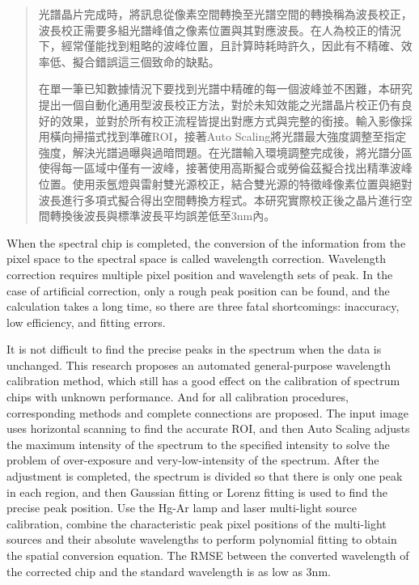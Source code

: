 
\begin{abstract}
	\vspace{-1.1cm}
光譜晶片完成時，將訊息從像素空間轉換至光譜空間的轉換稱為波長校正，波長校正需要多組光譜峰值之像素位置與其對應波長。在人為校正的情況下，經常僅能找到粗略的波峰位置，且計算時耗時許久，因此有不精確、效率低、擬合錯誤這三個致命的缺點。\par
在單一筆已知數據情況下要找到光譜中精確的每一個波峰並不困難，本研究提出一個自動化通用型波長校正方法，對於未知效能之光譜晶片校正仍有良好的效果，並對於所有校正流程皆提出對應方式與完整的銜接。輸入影像採用橫向掃描式找到準確ROI，接著Auto Scaling將光譜最大強度調整至指定強度，解決光譜過曝與過暗問題。在光譜輸入環境調整完成後，將光譜分區使得每一區域中僅有一波峰，接著使用高斯擬合或勞倫茲擬合找出精準波峰位置。使用汞氬燈與雷射雙光源校正，結合雙光源的特徵峰像素位置與絕對波長進行多項式擬合得出空間轉換方程式。本研究實際校正後之晶片進行空間轉換後波長與標準波長平均誤差低至3nm內。
\end{abstract}

\begin{abstract*}
	\vspace{-1cm}
When the spectral chip is completed, the conversion of the information from the pixel space to the spectral space is called wavelength correction. Wavelength correction requires multiple pixel position and wavelength sets of peak. In the case of artificial correction, only a rough peak position can be found, and the calculation takes a long time, so there are three fatal shortcomings: inaccuracy, low efficiency, and fitting errors.\par

 It is not difficult to find the precise peaks in the spectrum when the data is unchanged. This research proposes an automated general-purpose wavelength calibration method, which still has a good effect on the calibration of spectrum chips with unknown performance. And for all calibration procedures, corresponding methods and complete connections are proposed. The input image uses horizontal scanning to find the accurate ROI, and then Auto Scaling adjusts the maximum intensity of the spectrum to the specified intensity to solve the problem of over-exposure and very-low-intensity of the spectrum. After the adjustment is completed, the spectrum is divided so that there is only one peak in each region, and then Gaussian fitting or Lorenz fitting is used to find the precise peak position. Use the Hg-Ar lamp and laser multi-light source calibration, combine the characteristic peak pixel positions of the multi-light sources and their absolute wavelengths to perform polynomial fitting to obtain the spatial conversion equation. The RMSE between the converted wavelength of the corrected chip and the standard wavelength is as low as 3nm.

\end{abstract*}